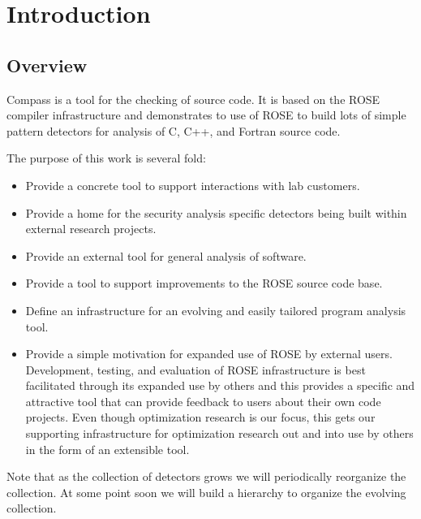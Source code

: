 \chapter{Introduction}

\section{Overview}

\label{introduction::overview}

   Compass is a tool for the checking of source code.  It is
based on the ROSE compiler infrastructure and demonstrates to
use of ROSE to build lots of simple pattern detectors for analysis
of C, C++, and Fortran source code.

   The purpose of this work is several fold:
\begin{itemize}
   \item Provide a concrete tool to support interactions with lab customers.
   \item Provide a home for the security analysis specific detectors being built within
         external research projects.
   \item Provide an external tool for general analysis of software.
   \item Provide a tool to support improvements to the ROSE source code base.
   \item Define an infrastructure for an evolving and easily tailored program analysis tool.
   \item Provide a simple motivation for expanded use of ROSE by external users.
         Development, testing, and evaluation of ROSE infrastructure is best facilitated 
         through its expanded use by others and this provides a specific and attractive
         tool that can provide feedback to users about their own code projects.  Even
         though optimization research is our focus, this gets our supporting
         infrastructure for optimization research out and into use by others in the form
         of an extensible tool.
\end{itemize}

   Note that as the collection of detectors grows we will periodically reorganize the 
collection.  At some point soon we will build a hierarchy to organize the evolving
collection.

